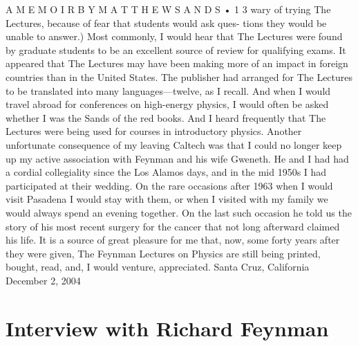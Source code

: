 \documentclass[11pt,oneside]{article}
\begin{document}
A  M E M O I R  B Y  M A T T H E W  S A N D S • 1 3 wary of trying The Lectures, because of fear that students would ask ques- tions they would be unable to answer.) Most commonly, I would hear that The Lectures were found by graduate students to be an excellent source of review for qualifying exams. It appeared that The Lectures may have been making more of an impact in foreign countries than in the United States. The publisher had arranged for The Lectures to be translated into many languages---twelve, as I recall. And when I would travel abroad for conferences on high-energy physics, I would often be asked whether I was the Sands of the red books. And I heard frequently that The Lectures were being used for courses in introductory physics. Another unfortunate consequence of my leaving Caltech was that I could no longer keep up my active association with Feynman and his wife Gweneth. He and I had had a cordial collegiality since the Los Alamos days, and in the mid 1950s I had participated at their wedding. On the rare occasions after 1963 when I would visit Pasadena I would stay with them, or when I visited with my family we would always spend an evening together. On the last such occasion he told us the story of his most recent surgery for the cancer that not long afterward claimed his life. It is a source of great pleasure for me that, now, some forty years after they were given, The Feynman Lectures on Physics are still being printed, bought, read, and, I would venture, appreciated. Santa Cruz, California December 2, 2004\par



\clearpage


\section*{Interview with Richard Feynman}



\label{tips-sec-6-interview-with-richard-feynman}

\end{document}
